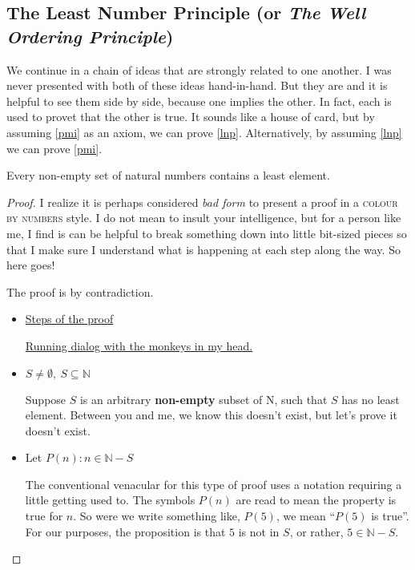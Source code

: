 \newpage
\subsection*{The Least Number Principle (or \emph{The Well Ordering Principle})}
We continue in a chain of ideas that are strongly related to one another.  I was never presented with both of these ideas hand-in-hand.  But they are and it is helpful to see them side by side, because one implies the other.  In fact, each is used to provet that the other is true.  It sounds like a house of card, but by assuming \ref{pmi} as an axiom, we can prove \ref{lnp}.  Alternatively, by assuming \ref{lnp} we can prove \ref{pmi}.  

\begin{theorem}
Every non-empty set of natural numbers contains a least element.
\label{lnp}
\begin{proof}
I realize it is perhaps considered \emph{bad form} to present a proof in a \textsc{colour by numbers} style.  I do not mean to insult your intelligence, but for a person like me, I find is can be helpful to break something down into little bit-sized pieces so that I make sure I understand what is happening at each step along the way.  So here goes!

The proof is by contradiction. 
\begin{itemize}
\item[] \begin{minipage}{0.3\textwidth}
\underline{Steps of the proof}
\end{minipage}
\hfill\begin{minipage}{0.6\textwidth}\underline{Running dialog  with the monkeys in my head.}
\end{minipage}

\item \begin{minipage}[t]{0.3\textwidth}
$S\neq \emptyset, ~S\subseteq \mathbb{N}$ 
\end{minipage}
\hfill\begin{minipage}[t]{0.6\textwidth}Suppose $S$ is an arbitrary \textbf{non-empty} subset of N, such that $S$ has no least element. Between you and me, we know this doesn't exist, but let's prove it doesn't exist.
\end{minipage}

\item \begin{minipage}[t]{0.3\textwidth}Let $P(n): n\in\mathbb{N}-S$
\end{minipage}
\hfill\begin{minipage}[t]{0.6\textwidth}  The conventional venacular for this type of proof uses a notation requiring  a little getting used to.  The symbols $P(n)$ are read to mean  the property is true for $n$.  So were we write something like, $P(5)$, we mean ``$P(5)$ is true''.  For our purposes, the proposition is that $5$ is not in $S$, or rather, $5\in\mathbb{N}-S$.
\end{minipage}


\end{itemize}
\end{proof}
\end{theorem}
